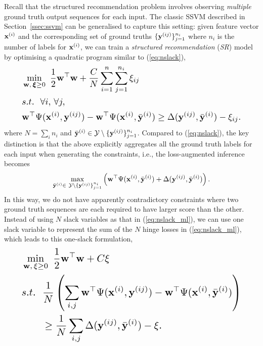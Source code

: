 Recall that the structured recommendation problem
involves observing \emph{multiple} ground truth output sequences for each input.
The classic SSVM described in Section~\ref{ssec:ssvm} can be generalised to capture this setting:
given feature vector $\mathbf{x}^{(i)}$ and the corresponding set of ground truths $\{\mathbf{y}^{(ij)}\}_{j=1}^{n_i}$
where $n_i$ is the number of labels for $\mathbf{x}^{(i)}$,
we can train a \emph{structured recommendation} (\emph{SR}) model by optimising a quadratic program similar to (\ref{eq:nslack}),
\begin{equation}
\label{eq:nslack_ml}
\resizebox{0.9\linewidth}{!}{$
\begin{aligned}
&\min_{\w, \, \bm{\xi} \ge 0} ~ \frac{1}{2} \w^\top \w + \frac{C}{N} \sum_{i=1}^n \sum_{j=1}^{n_i} \xi_{ij} \\
&s.t.~~ \forall i, \, \forall j, \\
& \w^\top \Psi(\x^{(i)}, \y^{(ij)}) - \w^\top \Psi(\x^{(i)}, \bar{\y}^{(i)}) \ge
  \Delta(\y^{(ij)}, \bar{\y}^{(i)}) - \xi_{ij}.
\end{aligned}
$}
\end{equation}
where $N = \sum_i n_i$ and $\bar{\mathbf{y}}^{(i)} \in \mathcal{Y} \setminus \{\mathbf{y}^{(ij)}\}_{j=1}^{n_i}$.
Compared to (\ref{eq:nslack}), the key distinction is that the above
explicitly aggregates all the ground truth labels for each input when generating the constraints,
i.e., the loss-augmented inference becomes
\begin{equation}
\label{eq:loss_aug_inf}
\max_{\bar{\mathbf{y}}^{(i)} \in \ \mathcal{Y} \setminus \{\mathbf{y}^{(ij)}\}_{j=1}^{n_i}}
     \left( \mathbf{w}^\top \Psi(\mathbf{x}^{(i)}, \bar{\mathbf{y}}^{(i)}) + \Delta(\mathbf{y}^{(ij)}, \bar{\mathbf{y}}^{(i)}) \right).
\end{equation}
In this way, we do not have apparently contradictory constraints where
two ground truth sequences are each required to have larger score than the other.
Instead of using $N$ slack variables as that in (\ref{eq:nslack_ml}),
we can use one slack variable to represent the sum of the $N$ hinge losses in (\ref{eq:nslack_ml}),
which leads to this one-slack formulation,
\begin{equation}
\label{eq:1slack_ml}
\resizebox{0.9\linewidth}{!}{$
\begin{aligned}
& \min_{\w, \, \xi \ge 0} ~\frac{1}{2} \w^\top \w + C \xi \\
& s.t.~~ \frac{1}{N} \left( \sum_{i,j} \w^\top \Psi(\x^{(i)}, \y^{(ij)}) - \w^\top \Psi(\x^{(i)}, \bar{\y}^{(i)}) \right) \\
& \hspace{2em} \ge \frac{1}{N} \sum_{i,j} \Delta(\y^{(ij)}, \bar{\y}^{(i)}) - \xi.
\end{aligned}
$}
\end{equation}
